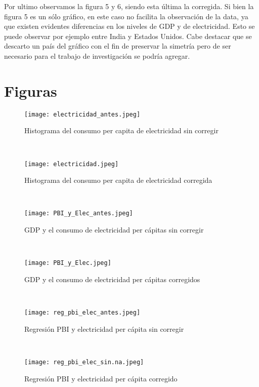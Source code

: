 \documentclass{article}
\begin{document}
Por ultimo observamos la figura 5 y 6, siendo esta última la corregida. Si bien la figura 5 es un sólo gráfico, en este caso no  facilita la observación de la data, ya que existen evidentes diferencias en los niveles de GDP y de electricidad. Esto se puede observar por ejemplo entre India y Estados Unidos. Cabe destacar que se descarto un país del gráfico con el fin de preservar la simetría pero de ser necesario para el trabajo de investigación se podría agregar.\\  





\newpage
\section{Figuras}

\begin{figure}[htbp]
\centerline{\texttt{[image: electricidad\_antes.jpeg]}}
\caption{Histograma del consumo per capita de electricidad sin corregir}
\label{fig}
\end{figure}\\



\begin{figure}[htbp]
\centerline{\texttt{[image: electricidad.jpeg]}}
\caption{Histograma del consumo per capita de electricidad corregida}
\label{fig}
\end{figure}\\



\begin{figure}[htbp]
\centerline{\texttt{[image: PBI\_y\_Elec\_antes.jpeg]}}
\caption{GDP y el consumo de electricidad per cápitas sin corregir}
\label{fig}
\end{figure}\\



\begin{figure}[htbp]
\centerline{\texttt{[image: PBI\_y\_Elec.jpeg]}}
\caption{GDP y el consumo de electricidad per cápitas corregidos}
\label{fig}
\end{figure}\\




\begin{figure}[htbp]
\centerline{\texttt{[image: reg\_pbi\_elec\_antes.jpeg]}}
\caption{Regresión PBI  y electricidad per cápita sin corregir}
\label{fig}
\end{figure}\\



\begin{figure}[htbp]
\centerline{\texttt{[image: reg\_pbi\_elec\_sin.na.jpeg]}}
\caption{Regresión PBI  y electricidad per cápita corregido}
\label{fig}
\end{figure}\\











\maketitle
\end{document}
